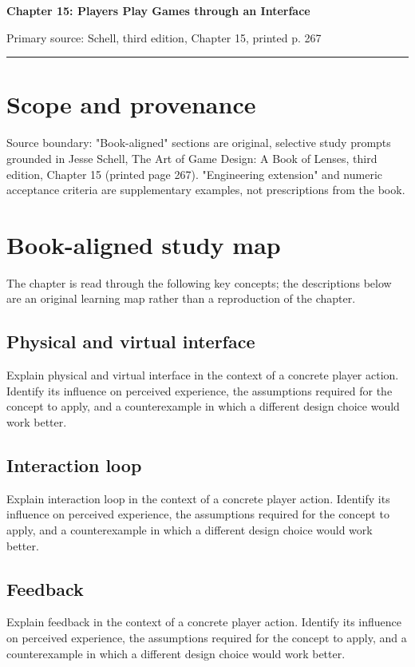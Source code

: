 \documentclass[11pt]{article}
\begin{document}
{\huge\bfseries\color{suiteblue} Chapter 15: Players Play Games through an Interface}\par
\vspace{0.15in}
{\normalsize\color{suitegray} Primary source: Schell, third edition, Chapter 15, printed p. 267}\par
\vspace{0.15in}\hrule\vspace{0.15in}

\section{Scope and provenance}
Source boundary: "Book-aligned" sections are original, selective study prompts grounded in Jesse Schell, The Art of Game Design: A Book of Lenses, third edition, Chapter 15 (printed page 267). "Engineering extension" and numeric acceptance criteria are supplementary examples, not prescriptions from the book.


\section{Book-aligned study map}
The chapter is read through the following key concepts; the descriptions below are an original learning map rather than a reproduction of the chapter.


\subsection{Physical and virtual interface}
Explain physical and virtual interface in the context of a concrete player action. Identify its influence on perceived experience, the assumptions required for the concept to apply, and a counterexample in which a different design choice would work better.


\subsection{Interaction loop}
Explain interaction loop in the context of a concrete player action. Identify its influence on perceived experience, the assumptions required for the concept to apply, and a counterexample in which a different design choice would work better.


\subsection{Feedback}
Explain feedback in the context of a concrete player action. Identify its influence on perceived experience, the assumptions required for the concept to apply, and a counterexample in which a different design choice would work better.
\end{document}

